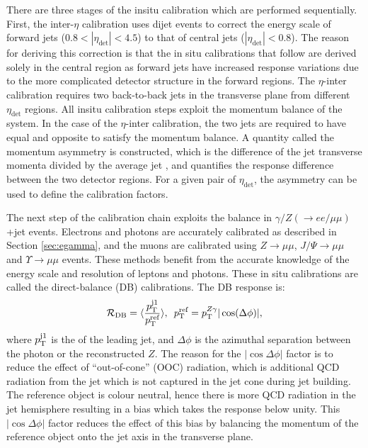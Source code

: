 There are three stages of the insitu calibration which are performed sequentially. First, the inter-$\eta$ calibration uses dijet events to correct the energy scale of forward jets ($0.8 < |\eta_{\text{det}}| < 4.5$) to that of central jets ($|\eta_{\text{det}}|<0.8$). The reason for deriving this correction is that the in situ calibrations that follow are derived solely in the central region as forward jets have increased response variations due to the more complicated detector structure in the forward regions. The $\eta$-inter calibration requires two back-to-back jets in the transverse plane from different $\eta_{\text{det}}$ regions. All insitu calibration steps exploit the momentum balance of the system. In the case of the $\eta$-inter calibration, the two jets are required to have equal and opposite \pt to satisfy the momentum balance. A quantity called the momentum asymmetry is constructed, which is the difference of the jet transverse momenta divided by the average jet \pt, and quantifies the response difference between the two detector regions. For a given pair of $\eta_{\text{det}}$, the asymmetry can be used to define the calibration factors.

The next step of the calibration chain exploits the \pt balance in $\gamma/Z(\rightarrow ee/\mu\mu)$+jet events. Electrons and photons are accurately calibrated as described in Section \ref{sec:egamma}, and the muons are calibrated using $Z\rightarrow\mu\mu$, $J/\Psi\rightarrow\mu\mu$ and $\Upsilon\rightarrow\mu\mu$ events. These methods benefit from the accurate knowledge of the energy scale and resolution of leptons and photons. These in situ calibrations are called the direct-balance (DB) calibrations. The DB response is:
\begin{equation}
    \mathcal{R}_{\text{DB}}=\langle\frac{p_{\text{T}}^{\text{j1}}}{p_{\text{T}}^{\text{ref}}}\rangle,\hspace{5pt}p_{\text{T}}^{\text{ref}}=p_{\text{T}}^{Z\gamma}|\cos(\Delta\phi)|,
\end{equation}
where $p_{\text{T}}^{\text{j1}}$ is the \pt of the leading jet, and $\Delta\phi$ is the azimuthal separation between the photon or the reconstructed $Z$. The reason for the $|\cos\Delta\phi|$ factor is to reduce the effect of ``out-of-cone'' (OOC) radiation, which is additional QCD radiation from the jet which is not captured in the jet cone during jet building. The reference object is colour neutral, hence there is more QCD radiation in the jet hemisphere resulting in a bias which takes the response below unity. This $|\cos\Delta\phi|$ factor reduces the effect of this bias by balancing the momentum of the reference object onto the jet axis in the transverse plane. 

